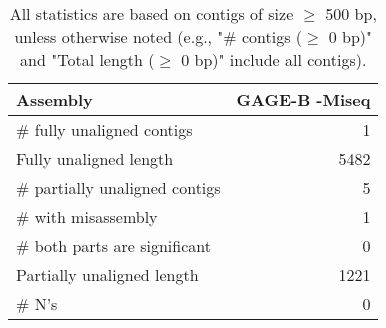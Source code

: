 \documentclass[12pt,a4paper]{article}
\begin{document}
\begin{table}[ht]
\begin{center}
\caption{All statistics are based on contigs of size $\geq$ 500 bp, unless otherwise noted (e.g., "\# contigs ($\geq$ 0 bp)" and "Total length ($\geq$ 0 bp)" include all contigs).}
\begin{tabular}{|l*{1}{|r}|}
\hline
Assembly & GAGE-B -Miseq \\ \hline
\# fully unaligned contigs & 1 \\ \hline
Fully unaligned length & 5482 \\ \hline
\# partially unaligned contigs & 5 \\ \hline
\hspace{5mm}\# with misassembly & 1 \\ \hline
\hspace{5mm}\# both parts are significant & 0 \\ \hline
Partially unaligned length & 1221 \\ \hline
\# N's & 0 \\ \hline
\end{tabular}
\end{center}
\end{table}
\end{document}
